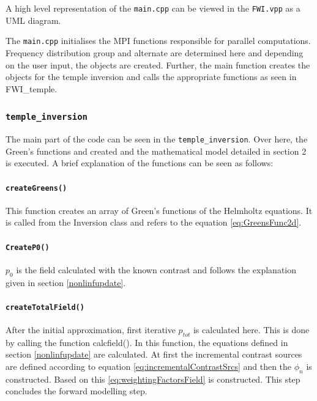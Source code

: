 \documentclass[10pt,a4paper]{article}
\begin{document}
A high level representation of the \texttt{main.cpp} can be viewed in
the \texttt{FWI.vpp} as a UML diagram.
\newline

The \texttt{main.cpp} initialises the MPI functions responsible for parallel
computations. Frequency distribution group and alternate are
determined here and depending on the user input, the objects are
created. Further, the main function creates the objects for the temple
inversion and calls the appropriate functions as seen in FWI\_temple.

\subsubsection{\texttt{temple\_inversion}}

The main part of the code can be seen in the
\texttt{temple\_inversion}. Over here, the Green's functions and
created and the mathematical model detailed in section 2 is executed.
A brief explanation of the functions can be seen as follows:

\paragraph{\texttt{createGreens()}}

This function creates an array of Green's functions of the Helmholtz
equations. It is called from the Inversion class and refers to the
equation \ref{eq:GreensFunc2d}.

\paragraph{\texttt{CreateP0()}}
$p_0$ is the field calculated with the known contrast and follows the
explanation given in section \ref{nonlinfupdate}.

\paragraph{\texttt{createTotalField()}}

After the initial approximation, first iterative $p_{tot}$ is
calculated here. This is done by calling the function calcfield(). In
this function, the equations defined in section \ref{nonlinfupdate} are calculated.
At first the incremental contrast sources are defined according to
equation \ref{eq:incrementalContrastSrcs} and then the $\phi_n$ is constructed. Based on
this \ref{eq:weightingFactorsField} is constructed. This step concludes the forward
modelling step.\\
\end{document}
